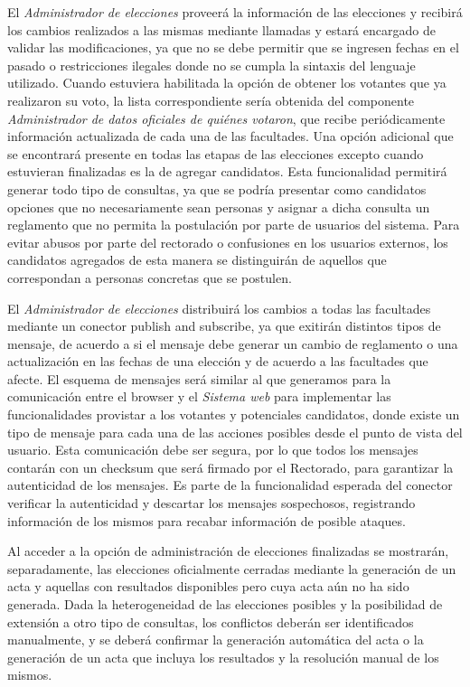 El \emph{Administrador de elecciones} proveerá la información de las elecciones y recibirá los cambios realizados a las mismas mediante llamadas y estará encargado de validar las modificaciones, ya que no se debe permitir que se ingresen fechas en el pasado o restricciones ilegales donde no se cumpla la sintaxis del lenguaje utilizado. Cuando estuviera habilitada la opción de obtener los votantes que ya realizaron su voto, la lista correspondiente sería obtenida del componente \emph{Administrador de datos oficiales de quiénes votaron}, que recibe periódicamente información actualizada de cada una de las facultades. Una opción adicional que se encontrará presente en todas las etapas de las elecciones excepto cuando estuvieran finalizadas es la de agregar candidatos. Esta funcionalidad permitirá generar todo tipo de consultas, ya que se podría presentar como candidatos opciones que no necesariamente sean personas y asignar a dicha consulta un reglamento que no permita la postulación por parte de usuarios del sistema. Para evitar abusos por parte del rectorado o confusiones en los usuarios externos, los candidatos agregados de esta manera se distinguirán de aquellos que correspondan a personas concretas que se postulen.

El \emph{Administrador de elecciones} distribuirá los cambios a todas las facultades mediante un conector publish and subscribe, ya que exitirán distintos tipos de mensaje, de acuerdo a si el mensaje debe generar un cambio de reglamento o una actualización en las fechas de una elección y de acuerdo a las facultades que afecte. El esquema de mensajes será similar al que generamos para la comunicación entre el browser y el \emph{Sistema web} para implementar las funcionalidades provistar a los votantes y potenciales candidatos, donde existe un tipo de mensaje para cada una de las acciones posibles desde el punto de vista del usuario.
Esta comunicación debe ser segura, por lo que todos los mensajes contarán con un checksum que será firmado por el Rectorado, para garantizar la autenticidad de los mensajes. Es parte de la funcionalidad esperada del conector verificar la autenticidad y descartar los mensajes sospechosos, registrando información de los mismos para recabar información de posible ataques. 


Al acceder a la opción de administración de elecciones finalizadas se mostrarán, separadamente, las elecciones oficialmente cerradas mediante la generación de un acta y aquellas con resultados disponibles pero cuya acta aún no ha sido generada. Dada la heterogeneidad de las elecciones posibles y la posibilidad de extensión a otro tipo de consultas, los conflictos deberán ser identificados manualmente, y se deberá confirmar la generación automática del acta o la generación de un acta que incluya los resultados y la resolución manual de los mismos. 

